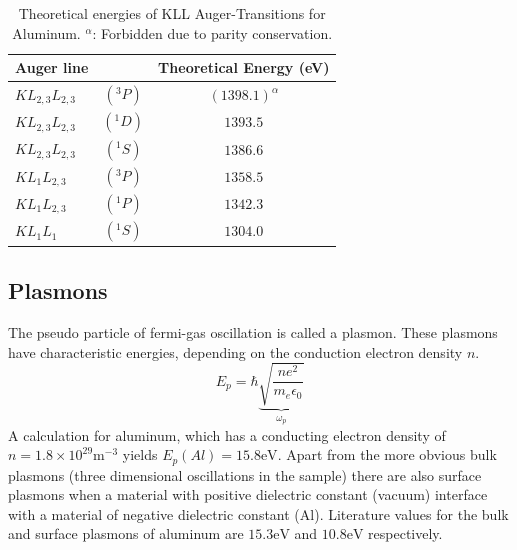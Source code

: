 \documentclass[a4paper]{scrartcl}
\numberwithin{equation}{section}
\numberwithin{figure}{section}
\numberwithin{table}{section}
\begin{document}
%

\begin{table}[!h]
\centering

\begin{tabular}{lcc}
\toprule
Auger line & & Theoretical Energy (eV) \\
\midrule
 $KL_{2,3}L_{2,3}$&$(^3P)$  & $(1398.1)^\alpha$ \\
$ KL_{2,3}L_{2,3}$&$(^1D) $ & $1393.5$ \\
$ KL_{2,3}L_{2,3}$&$(^1S)$ & $1386.6 $ \\
$ KL_{1}L_{2,3}$&$(^3P)$ & $1358.5$ \\
$ KL_{1}L_{2,3}$&$(^1P)$ & $1342.3$ \\
$ KL_{1}L_{1}$&$(^1S)$ & $1304.0$ \\
 \bottomrule

\end{tabular}


\caption{\small Theoretical energies \cite{paper} of KLL Auger-Transitions for Aluminum. $^\alpha$: Forbidden due to parity conservation. }
\label{kll}
\end{table}

\FloatBarrier

\subsection{Plasmons}
\label{sec:plasmonIntro}
The pseudo particle of fermi-gas oscillation is called a plasmon. These plasmons have characteristic energies, depending on the conduction electron density $n$. 
$$E_p = \hbar \underbrace{\sqrt{\frac{ne^2}{m_e \epsilon_0}}}_{\omega_p}$$
A calculation for aluminum, which has a conducting electron density of $n=1.8 \times 10^{29} \text{m}^{-3}$ yields $E_p(Al)=15.8 \text{eV}$.
Apart from the more obvious bulk plasmons (three dimensional oscillations in the sample) there are also surface plasmons when a material with positive dielectric constant (vacuum) interface with a material of negative dielectric constant (Al). Literature values \cite{paperplasmon} for the bulk and surface plasmons of aluminum are $15.3 \text{eV}$ and $10.8 \text{eV}$ respectively.
\end{document}
